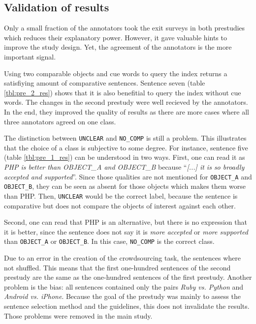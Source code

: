 \subsection{Validation of results}
Only a small fraction of the annotators took the exit surveys in both prestudies which reduces their explanatory power. However, it gave valuable hints to improve the study design. Yet, the agreement of the annotators is the more important signal.


Using two comparable objects and cue words to query the index returns a satisfiying amount of comparative sentences. Sentence seven (table \ref{tbl:pre_2_res}) shows that it is also benefitial to query the index without cue words. The changes in the second prestudy were well recieved by the annotators. In the end, they improved the quality of results as there are more cases where all three annotators agreed on one class.


The distinction between \texttt{UNCLEAR} and \texttt{NO\_COMP} is still a problem. This illustrates that the choice of a class is subjective to some degree. For instance, sentence five (table \ref{tbl:pre_1_res}) can be understood in two ways. First, one can read it as \emph{PHP is better than OBJECT\_A and OBJECT\_B} because \enquote{\emph{[...] it is so broadly accepted and supported}}. Since those qualities are not mentioned for \texttt{OBJECT\_A} and \texttt{OBJECT\_B}, they can be seen as absent for those objects which makes them worse than PHP. Then, \texttt{UNCLEAR} would be the correct label, because the sentence is comparative but does not compare the objects of interest against each other.

Second, one can read that PHP is an alternative, but there is no expression that it is better, since the sentence does not say it is \emph{more accepted} or \emph{more supported} than \texttt{OBJECT\_A} or \texttt{OBJECT\_B}. In this case, \texttt{NO\_COMP} is the correct class.
\hfill\newline

Due to an error in the creation of the crowdsourcing task, the sentences where not shuffled. This means that the first one-hundred sentences of the second prestudy are the same as the one-hundred sentences of the first prestudy. Another problem is the bias: all sentences contained only the pairs \emph{Ruby vs. Python} and \emph{Android vs. iPhone}. Because the goal of the prestudy was mainly to assess the sentence selection method and the guidelines, this does not invalidate the results. Those problems were removed in the main study.
\hfill\newline

